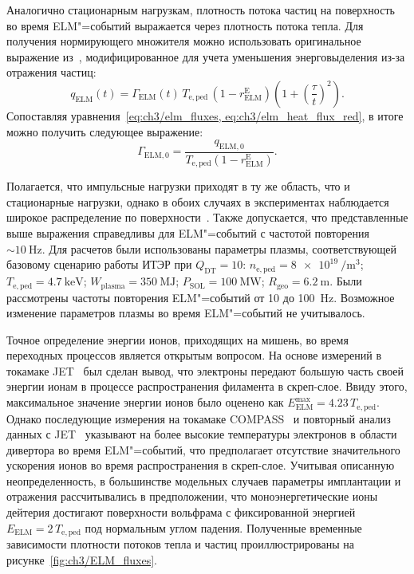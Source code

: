 Аналогично стационарным нагрузкам, плотность потока частиц на поверхность во время ELM"=событий выражается через плотность потока тепла. Для получения нормирующего множителя можно использовать оригинальное выражение из~\cite{Fundamenski2006, Moulton2013}, модифицированное для учета уменьшения энерговыделения из-за отражения частиц:
\begin{equation}
	\label{eq:ch3/elm_heat_flux_red}
	q_{\mathrm{ELM}}(t)=\Gamma_{\mathrm{ELM}}(t)\,T_{\mathrm{e,ped}}\,(1-r_{\mathrm{ELM}}^{\mathrm{E}})\left(1+\left(\frac{\tau}{t}\right)^2\right).
\end{equation}
Сопоставляя уравнения~\cref{eq:ch3/elm_fluxes, eq:ch3/elm_heat_flux_red}, в итоге можно получить следующее выражение:
\begin{equation}
	\Gamma_{\mathrm{ELM,0}}=\frac{q_{\mathrm{ELM,0}}}{T_{\mathrm{e,ped}}(1-r_{\mathrm{ELM}}^{\mathrm{E}})}.
\end{equation}

Полагается, что импульсные нагрузки приходят в ту же область, что и стационарные нагрузки, однако в обоих случаях в экспериментах наблюдается широкое распределение по поверхности~\cite{Pitts2019, Orrico2023, Eich2017}. Также допускается, что представленные выше выражения справедливы для ELM"=событий с частотой повторения $\sim\SI{10}{\hertz}$. Для расчетов были использованы параметры плазмы, соответствующей базовому сценарию работы ИТЭР при $Q_\mathrm{DT}=10$: $n_{\mathrm{e,ped}}=\SI{8e19}{\per\meter\cubed}$; $T_{\mathrm{e,ped}}=\SI{4.7}{\kilo\electronvolt}$; $W_{\mathrm{plasma}}=\SI{350}{\mega\joule}$; $P_{\mathrm{SOL}}=\SI{100}{\mega\watt}$; $R_{\mathrm{geo}}=\SI{6.2}{\meter}$. Были рассмотрены частоты повторения ELM"=событий от \num{10} до \SI{100}{\hertz}. Возможное изменение параметров плазмы во время ELM"=событий не учитывалось.

Точное определение энергии ионов, приходящих на мишень, во время переходных процессов является открытым вопросом. На основе измерений в токамаке JET~\cite{Guillemaut2015, Guillemaut2018} был сделан вывод, что электроны передают большую часть своей энергии ионам в процессе распространения филамента в скреп-слое. Ввиду этого, максимальное значение энергии ионов было оценено как $E_{\mathrm{ELM}}^{\mathrm{max}}=4.23\,T_{\mathrm{e,ped}}$. Однако последующие измерения на токамаке COMPASS~\cite{Adamek2020} и повторный анализ данных с JET~\cite{Horacek2023} указывают на более высокие температуры электронов в области дивертора во время ELM"=событий, что предполагает отсутствие значительного ускорения ионов во время распространения в скреп-слое. Учитывая описанную неопределенность, в большинстве модельных случаев параметры имплантации и отражения рассчитывались в предположении, что моноэнергетические ионы дейтерия достигают поверхности вольфрама с фиксированной энергией $E_{\mathrm{ELM}}=2\,T_{\mathrm{e,ped}}$ под нормальным углом падения. Полученные временные зависимости плотности потоков тепла и частиц проиллюстрированы на рисунке~\ref{fig:ch3/ELM_fluxes}.

